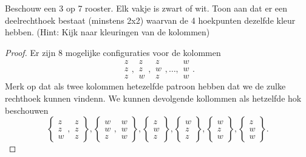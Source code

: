 \begin{oef}
	Beschouw een 3 op 7 rooster. Elk vakje is zwart of wit. Toon aan dat er een deelrechthoek bestaat (minstens 2x2) waarvan  de 4 hoekpunten dezelfde kleur hebben.
	(Hint: Kijk naar kleuringen van de kolommen)
\end{oef}
\begin{proof}
Er zijn 8 mogelijke configuraties voor de kolommen
\[
\begin{matrix}
	z \\ z \\z
\end{matrix}, 
\begin{matrix}
	z \\ z \\ w
\end{matrix}, 
\begin{matrix}
z \\ w \\ z	
\end{matrix}
, 
\ldots, 
\begin{matrix}
	w \\ w \\ w
\end{matrix}
.\] 
Merk op dat als twee kolommen hetezelfde patroon hebben dat we de zulke rechthoek kunnen vindenn.
We kunnen devolgende kollommen als hetzelfde hok beschouwen
\[
\left\{
\begin{matrix}
	z \\ z \\w
\end{matrix}
,
\begin{matrix}
	z \\ z \\ z
\end{matrix}
\right\}
, 
\left\{ 
\begin{matrix}
	w \\ w \\ z
\end{matrix},
\begin{matrix}
	w \\ w \\ w
\end{matrix}
\right\} 
, 
\left\{ 
\begin{matrix}
	z \\ w \\z 
\end{matrix}
\right\} 
,
\left\{ 
\begin{matrix}
	w \\ z \\ z
\end{matrix}\right\} ,
\left\{ 
\begin{matrix}
	w \\ z \\ w
\end{matrix}\right\},
\left\{ 
\begin{matrix}
	z \\ w \\ w
\end{matrix}\right\} 
.\] 
\end{proof}

